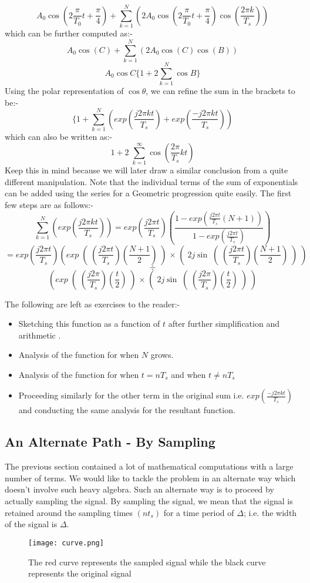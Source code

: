 \[
A_{0} \cos \left (2\frac{\pi}{T_{0}}t+\frac{\pi}{4}\right) + \sum_{k=1}^{N}\left( 2 A_{0} \cos \left (2\frac{\pi}{T_{0}}t+\frac{\pi}{4}\right) \cos \left( \frac{2\pi k}{T_{s}}\right)\right)
\]
which can be further computed as:-
\[
A_{0} \cos (C) + \sum_{k=1}^{N}\left( 2A_{0} \cos  (C) \cos (B)\right)
\]
\[
A_{0}\cos C \lbrace 1 + 2\sum_{k=1}^{N} \cos B \rbrace
\]
Using the polar representation of $\cos \theta$, we can refine the sum in the brackets to be:-
\[
\lbrace 1+ \sum_{k=1}^{N} \left( exp(\frac{j 2 \pi k t }{T_{s}}) + exp(\frac{-j 2 \pi k t }{T_{s}})  \right)
\]
which can also be written as:-
\[
1+2\;\sum_{k=1}^{\infty} \cos (\frac{2\pi}{T_{s}}kt)
\]
Keep this in mind because we will later draw a similar conclusion from a quite different manipulation.
\noindent Note that the individual terms of the sum of exponentials can be added using the series for a Geometric progression quite easily. The first few steps are as follows:-
\[
\sum_{k=1}^{N} \left( exp(\frac{j 2 \pi k t }{T_{s}}) \right) = exp(\frac{j2\pi t}{T_{s}})\left( \frac{1-exp(\frac{j2\pi t}{T_{s}} (N+1))}{1-exp(\frac{j2\pi t}{T_{s}})}\right) 
\]
\[
=exp(\frac{j2\pi t}{T_{s}}) \left( exp\middle ((\frac{j2\pi t}{T_{s}})(\frac{N+1}{2})\middle) \times  \middle( 2j\sin\middle((\frac{j2\pi t}{T_{s}})(\frac{N+1}{2})\middle)\right)\]\[ \div\]\[ \left( exp\middle ((\frac{j2\pi }{T_{s}})(\frac{t}{2})\middle) \times  \middle( 2j\sin\middle((\frac{j2\pi }{T_{s}})(\frac{t}{2})\middle)\right)
\]

The following are left as exercises to the reader:-
\begin{itemize}
\item Sketching this function as a function of $t$ after further simplification and arithmetic .
\item Analysis of the function for when $N$ grows.
\item Analysis of the function for when $t=nT_{s}$ and when $t \neq nT_{s}$
\item Proceeding similarly for the other term in the original sum i.e. $ exp(\frac{-j 2 \pi k t }{T_{s}})$ and conducting the same analysis for the resultant function.
\end{itemize}


\subsection{An Alternate Path - By Sampling}

\noindent The previous section contained a lot of mathematical computations with a large number of terms. We would like to tackle the problem in an alternate way which doesn't involve such heavy algebra.
\newline
Such an alternate way is to proceed by actually sampling the signal. By sampling the signal, we mean that the signal is retained around the sampling times $(nt_{s})$ for a time period of $\Delta$; i.e. the width of the signal is $\Delta$.
\begin{figure}[h]
\centering
\texttt{[image: curve.png]}
\caption{The red curve represents the sampled signal while the black curve represents the original signal}
\end{figure}

